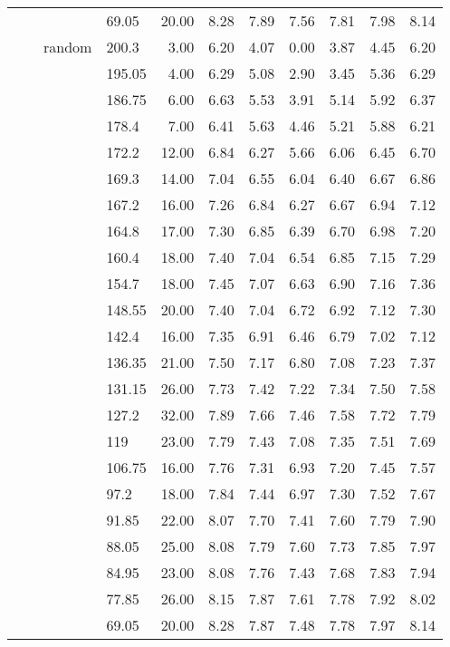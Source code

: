 \begin{longtable}{llllrrrrrrr}
   &  &  & 69.05 & 20.00 & 8.28 & 7.89 & 7.56 & 7.81 & 7.98 & 8.14 \\ 
   &  & random & 200.3 & 3.00 & 6.20 & 4.07 & 0.00 & 3.87 & 4.45 & 6.20 \\ 
   &  &  & 195.05 & 4.00 & 6.29 & 5.08 & 2.90 & 3.45 & 5.36 & 6.29 \\ 
   &  &  & 186.75 & 6.00 & 6.63 & 5.53 & 3.91 & 5.14 & 5.92 & 6.37 \\ 
   &  &  & 178.4 & 7.00 & 6.41 & 5.63 & 4.46 & 5.21 & 5.88 & 6.21 \\ 
   &  &  & 172.2 & 12.00 & 6.84 & 6.27 & 5.66 & 6.06 & 6.45 & 6.70 \\ 
   &  &  & 169.3 & 14.00 & 7.04 & 6.55 & 6.04 & 6.40 & 6.67 & 6.86 \\ 
   &  &  & 167.2 & 16.00 & 7.26 & 6.84 & 6.27 & 6.67 & 6.94 & 7.12 \\ 
   &  &  & 164.8 & 17.00 & 7.30 & 6.85 & 6.39 & 6.70 & 6.98 & 7.20 \\ 
   &  &  & 160.4 & 18.00 & 7.40 & 7.04 & 6.54 & 6.85 & 7.15 & 7.29 \\ 
   &  &  & 154.7 & 18.00 & 7.45 & 7.07 & 6.63 & 6.90 & 7.16 & 7.36 \\ 
   &  &  & 148.55 & 20.00 & 7.40 & 7.04 & 6.72 & 6.92 & 7.12 & 7.30 \\ 
   &  &  & 142.4 & 16.00 & 7.35 & 6.91 & 6.46 & 6.79 & 7.02 & 7.12 \\ 
   &  &  & 136.35 & 21.00 & 7.50 & 7.17 & 6.80 & 7.08 & 7.23 & 7.37 \\ 
   &  &  & 131.15 & 26.00 & 7.73 & 7.42 & 7.22 & 7.34 & 7.50 & 7.58 \\ 
   &  &  & 127.2 & 32.00 & 7.89 & 7.66 & 7.46 & 7.58 & 7.72 & 7.79 \\ 
   &  &  & 119 & 23.00 & 7.79 & 7.43 & 7.08 & 7.35 & 7.51 & 7.69 \\ 
   &  &  & 106.75 & 16.00 & 7.76 & 7.31 & 6.93 & 7.20 & 7.45 & 7.57 \\ 
   &  &  & 97.2 & 18.00 & 7.84 & 7.44 & 6.97 & 7.30 & 7.52 & 7.67 \\ 
   &  &  & 91.85 & 22.00 & 8.07 & 7.70 & 7.41 & 7.60 & 7.79 & 7.90 \\ 
   &  &  & 88.05 & 25.00 & 8.08 & 7.79 & 7.60 & 7.73 & 7.85 & 7.97 \\ 
   &  &  & 84.95 & 23.00 & 8.08 & 7.76 & 7.43 & 7.68 & 7.83 & 7.94 \\ 
   &  &  & 77.85 & 26.00 & 8.15 & 7.87 & 7.61 & 7.78 & 7.92 & 8.02 \\ 
   &  &  & 69.05 & 20.00 & 8.28 & 7.87 & 7.48 & 7.78 & 7.97 & 8.14 \\ 

\end{longtable}
